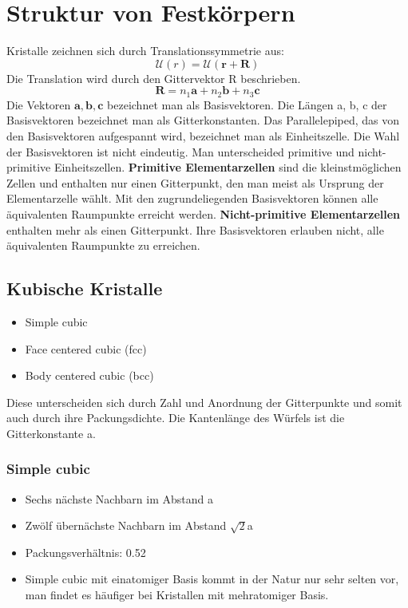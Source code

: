 \documentclass[11pt]{article}
\begin{document}
\section{Struktur von Festkörpern}
Kristalle zeichnen sich durch Translationssymmetrie aus:
\begin{equation}
  \mathcal{U}(r)= \mathcal{U}(\bm{r}+\bm{R})
\end{equation}
Die Translation wird durch den Gittervektor R beschrieben.
\begin{equation}
  \bm{R} = n_1\bm{a}+n_2\bm{b}+n_3\bm{c}
\end{equation}
Die Vektoren $\bm{a}, \bm{b}, \bm{c}$ bezeichnet man als Basisvektoren.
Die Längen a, b, c der Basisvektoren bezeichnet man als Gitterkonstanten. Das
Parallelepiped, das von den Basisvektoren aufgespannt wird, bezeichnet man als
Einheitszelle. Die Wahl der Basisvektoren ist nicht eindeutig. Man unterscheided
primitive und nicht-primitive Einheitszellen. \textbf{Primitive Elementarzellen}
sind die kleinstmöglichen Zellen und enthalten nur einen Gitterpunkt, den man
meist als Ursprung der Elementarzelle wählt. Mit den zugrundeliegenden
Basisvektoren können alle äquivalenten Raumpunkte erreicht werden.
\textbf{Nicht-primitive Elementarzellen} enthalten mehr als einen Gitterpunkt.
Ihre Basisvektoren erlauben nicht, alle äquivalenten Raumpunkte zu erreichen.
\subsection{Kubische Kristalle}
\begin{itemize}
  \item Simple cubic
  \item Face centered cubic (fcc)
  \item Body centered cubic (bcc)
\end{itemize}
Diese unterscheiden sich durch Zahl und Anordnung der Gitterpunkte und somit
auch durch ihre Packungsdichte. Die Kantenlänge des Würfels ist die
Gitterkonstante a.
\subsubsection{Simple cubic}
\begin{itemize}
  \item Sechs nächste Nachbarn im Abstand a
  \item Zwölf übernächste Nachbarn im Abstand $\sqrt{2}$a
  \item Packungsverhältnis: 0.52
  \item Simple cubic mit einatomiger Basis kommt in der Natur nur sehr selten
  vor, man findet es häufiger bei Kristallen mit mehratomiger Basis.
\end{itemize}
\end{document}
